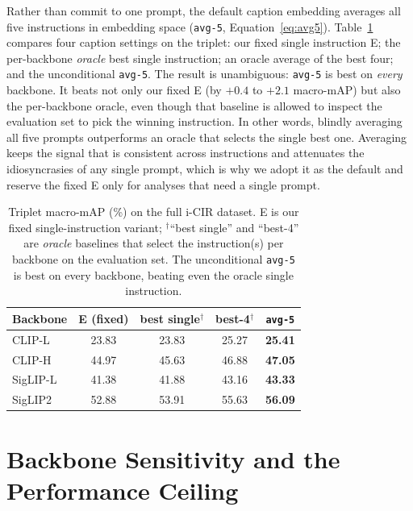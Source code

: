 Rather than commit to one prompt, the default caption embedding averages all
five instructions in embedding space (\texttt{avg-5}, Equation~\eqref{eq:avg5}).
Table~\ref{tab:res_aug} compares four caption settings on the triplet: our fixed
single instruction \textsc{E}; the per-backbone \emph{oracle} best single
instruction; an oracle average of the best four; and the unconditional
\texttt{avg-5}. The result is unambiguous: \texttt{avg-5} is best on \emph{every}
backbone. It beats not only our fixed \textsc{E} (by $+0.4$ to $+2.1$ macro-mAP)
but also the per-backbone oracle, even though that baseline is allowed to inspect
the evaluation set to pick the winning instruction. In other words, blindly
averaging all five prompts outperforms an oracle that selects the single best
one. Averaging keeps the signal that is consistent across instructions and
attenuates the idiosyncrasies of any single prompt, which is why we adopt it as
the default and reserve the fixed \textsc{E} only for analyses that need a single
prompt.

\begin{table}[h!]
\centering
\begin{tabular}{l c c c c}
\toprule
Backbone & \textsc{E} (fixed) & best single$^\dagger$ & best-4$^\dagger$ & \texttt{avg-5} \\ \midrule
CLIP-L   & 23.83 & 23.83 & 25.27 & \textbf{25.41} \\
CLIP-H   & 44.97 & 45.63 & 46.88 & \textbf{47.05} \\
SigLIP-L & 41.38 & 41.88 & 43.16 & \textbf{43.33} \\
SigLIP2  & 52.88 & 53.91 & 55.63 & \textbf{56.09} \\
\bottomrule
\end{tabular}
\caption[Caption augmentation: averaging vs.\ single instructions.]{Triplet
macro-mAP (\%) on the full i-CIR dataset. \textsc{E} is our fixed
single-instruction variant; $^\dagger$``best single'' and ``best-4'' are
\emph{oracle} baselines that select the instruction(s) per backbone on the
evaluation set. The unconditional \texttt{avg-5} is best on every
backbone, beating even the oracle single instruction.\label{tab:res_aug}}
\end{table}

\section{Backbone Sensitivity and the Performance Ceiling}\label{sect:res_backbones}

